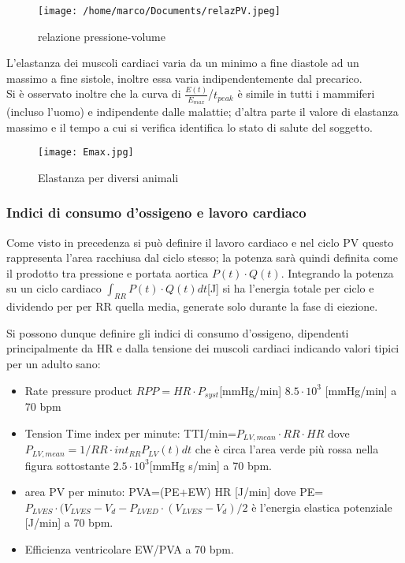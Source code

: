 \documentclass[10pt]{article}
\begin{document}
 \begin{figure}[h!]
\centering
\texttt{[image: /home/marco/Documents/relazPV.jpeg]}
\caption{relazione pressione-volume}
\label{fig:relazione volume pressione}
\end{figure}

L'elastanza dei muscoli cardiaci varia da un minimo a fine diastole ad un massimo a fine sistole, inoltre essa varia indipendentemente dal precarico.\\
Si è osservato inoltre che la curva di $\frac{E(t)}{E_{max}}$/$t_{peak}$ è simile in tutti i mammiferi (incluso l'uomo) e indipendente dalle malattie; d'altra parte il valore di elastanza massimo e il tempo a cui si verifica identifica lo stato di salute del soggetto.

 \begin{figure}[h!]
\centering
\texttt{[image: Emax.jpg]}
\caption{Elastanza per diversi animali}
\label{fig:Emax}
\end{figure}

\subsubsection{ Indici di consumo d'ossigeno e lavoro cardiaco}

Come visto in precedenza si può definire il lavoro cardiaco e nel ciclo PV questo rappresenta l'area racchiusa dal ciclo stesso; la potenza sarà quindi definita come il prodotto tra pressione e portata aortica $P(t)  \cdot Q(t)$. Integrando la potenza su un ciclo cardiaco $\int_{RR} P(t) \cdot Q(t) dt$[J] si ha l'energia totale per ciclo e dividendo per per RR quella media, generate solo durante la fase di eiezione.

Si possono dunque definire gli indici di consumo d'ossigeno, dipendenti principalmente da HR e dalla tensione dei muscoli cardiaci indicando valori tipici per un adulto sano:

\begin{itemize}
    \item Rate pressure product $RPP=HR \cdot P_{syst}$[mmHg/min] \textrightarrow $8.5 \cdot 10^3$ [mmHg/min] a 70 bpm
    \item Tension Time index per minute: TTI/min=$P_{LV,mean} \cdot RR \cdot HR$ dove $P_{LV,mean}=1/RR \cdot int_{RR}P_{LV}(t)dt$ che è circa l'area verde più rossa nella figura sottostante \textrightarrow $2.5 \cdot 10^3$[mmHg s/min] a 70 bpm.
    \item area PV per minuto: PVA=(PE+EW) HR [J/min] dove PE=$P_{LVES}\cdot (V_{LVES}-V_d-P_{LVED}\cdot(V_{LVES}-V_d)/2$ è l'energia elastica potenziale [J/min] a 70 bpm.
    \item Efficienza ventricolare EW/PVA  a 70 bpm.
\end{itemize}
\end{document}
